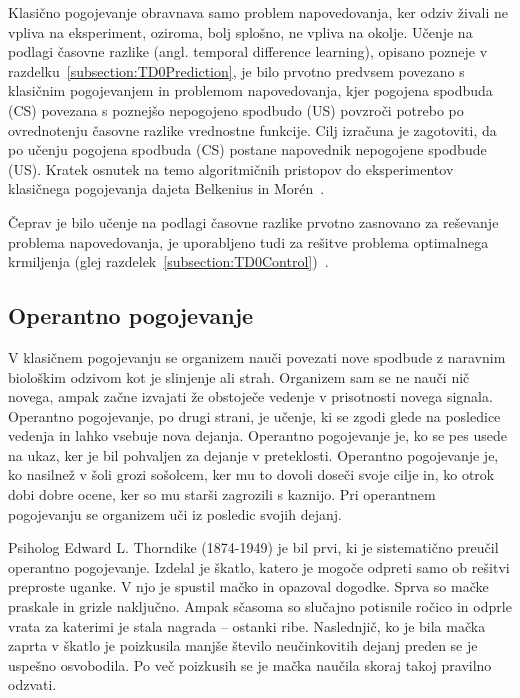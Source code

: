 \documentclass[a4paper, oneside, 12pt]{report}
\begin{document}
Klasično pogojevanje obravnava samo problem napovedovanja, ker odziv živali ne vpliva na eksperiment, oziroma, bolj splošno, ne vpliva na okolje. Učenje na podlagi časovne razlike (angl. temporal difference learning), opisano pozneje v razdelku~\ref{subsection:TD0Prediction}, je bilo prvotno predvsem povezano s klasičnim pogojevanjem in problemom napovedovanja, kjer pogojena spodbuda (CS) povezana s poznejšo nepogojeno spodbudo (US) povzroči potrebo po ovrednotenju časovne razlike vrednostne funkcije. Cilj izračuna je zagotoviti, da po učenju pogojena spodbuda (CS) postane napovednik nepogojene spodbude (US). Kratek osnutek na temo algoritmičnih pristopov do eksperimentov klasičnega pogojevanja dajeta Belkenius in Morén~\cite{ComputationalModelsOfClassicalConditioningAComparativeStudy}.

Čeprav je bilo učenje na podlagi časovne razlike prvotno zasnovano za reševanje problema napovedovanja, je uporabljeno tudi za rešitve problema optimalnega krmiljenja (glej razdelek~\ref{subsection:TD0Control})~\cite{ReinforcementLearningAnIntroduction}. %

\subsection{Operantno pogojevanje}
V klasičnem pogojevanju se organizem nauči povezati nove spodbude z naravnim biološkim odzivom kot je slinjenje ali strah. Organizem sam se ne nauči nič novega, ampak začne izvajati že obstoječe vedenje v prisotnosti novega signala. Operantno pogojevanje, po drugi strani, je učenje, ki se zgodi glede na posledice vedenja in lahko vsebuje nova dejanja. Operantno pogojevanje je, ko se pes usede na ukaz, ker je bil pohvaljen za dejanje v preteklosti. Operantno pogojevanje je, ko nasilnež v šoli grozi sošolcem, ker mu to dovoli doseči svoje cilje in, ko otrok dobi dobre ocene, ker so mu starši zagrozili s kaznijo. Pri operantnem pogojevanju se organizem uči iz posledic svojih dejanj.

Psiholog Edward L. Thorndike (1874-1949) je bil prvi, ki je sistematično preučil operantno pogojevanje. Izdelal je škatlo, katero je mogoče odpreti samo ob rešitvi preproste uganke. V njo je spustil mačko in opazoval dogodke. Sprva so mačke praskale in grizle naključno. Ampak sčasoma so slučajno potisnile ročico in odprle vrata za katerimi je stala nagrada -- ostanki ribe. Naslednjič, ko je bila mačka zaprta v škatlo je poizkusila manjše število neučinkovitih dejanj preden se je uspešno osvobodila. Po več poizkusih se je mačka naučila skoraj takoj pravilno odzvati.~\cite{AnimalIntelligence1}
\end{document}

